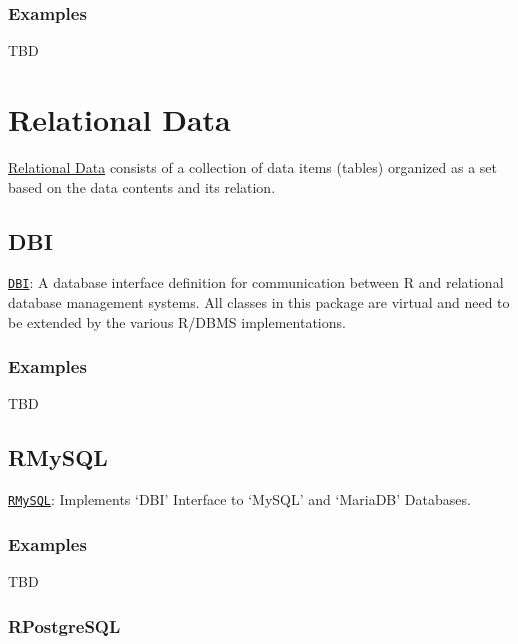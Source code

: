 \documentclass[]{book}
\begin{document}
\subsubsection{\texorpdfstring{\textbf{Examples
}}{Examples }}\label{examples-4}

TBD

\section{\texorpdfstring{\textbf{Relational
Data}}{Relational Data}}\label{relational-data}

\href{https://en.wikipedia.org/wiki/Relational_database}{Relational
Data} consists of a collection of data items (tables) organized as a set
based on the data contents and its relation.

\subsection{\texorpdfstring{\textbf{DBI}}{DBI}}\label{dbi}

\href{https://CRAN.R-project.org/package=DBI}{\texttt{DBI}}: A database
interface definition for communication between R and relational database
management systems. All classes in this package are virtual and need to
be extended by the various R/DBMS implementations.

\subsubsection{\texorpdfstring{\textbf{Examples
}}{Examples }}\label{examples-5}

TBD

\subsection{\texorpdfstring{\textbf{RMySQL }}{RMySQL }}\label{rmysql}

\href{https://CRAN.R-project.org/package=RMySQL}{\texttt{RMySQL}}:
Implements `DBI' Interface to `MySQL' and `MariaDB' Databases.

\subsubsection{\texorpdfstring{\textbf{Examples
}}{Examples }}\label{examples-6}

TBD

\subsubsection{\texorpdfstring{\textbf{RPostgreSQL
}}{RPostgreSQL }}\label{rpostgresql}
\end{document}
